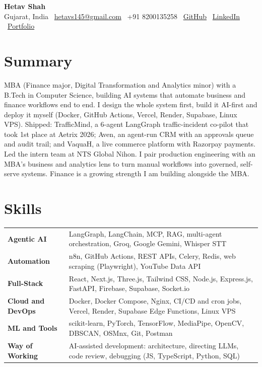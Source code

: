 \documentclass[a4paper,9pt]{extarticle}
\begin{document}
\begin{center}
  {\LARGE\bfseries Hetav Shah}\\[3pt]
  {\small
    Gujarat, India \textperiodcentered\
    \href{mailto:hetavs145@gmail.com}{hetavs145@gmail.com} \textperiodcentered\
    +91 8200135258 \textperiodcentered\
    \href{https://github.com/Hetavs145/}{GitHub} \textperiodcentered\
    \href{https://www.linkedin.com/in/hetav-shah-26601722b}{LinkedIn} \textperiodcentered\
    \href{https://portfolio.vaquah.in}{Portfolio}
  }
\end{center}
\vspace{2pt}

\section{Summary}
MBA (Finance major, Digital Transformation and Analytics minor) with a B.Tech in Computer Science, building AI systems that automate business and finance workflows end to end. I design the whole system first, build it AI-first and deploy it myself (Docker, GitHub Actions, Vercel, Render, Supabase, Linux VPS). Shipped: TrafficMind, a 6-agent LangGraph traffic-incident co-pilot that took 1st place at Aetrix 2026; Aven, an agent-run CRM with an approvals queue and audit trail; and VaquaH, a live commerce platform with Razorpay payments. Led the intern team at NTS Global Nihon. I pair production engineering with an MBA's business and analytics lens to turn manual workflows into governed, self-serve systems. Finance is a growing strength I am building alongside the MBA.

\section{Skills}
\begin{tabular}{@{}p{}p{}@{}}
\textbf{Agentic AI} & LangGraph, LangChain, MCP, RAG, multi-agent orchestration, Groq, Google Gemini, Whisper STT \\[1.5pt]
\textbf{Automation} & n8n, GitHub Actions, REST APIs, Celery, Redis, web scraping (Playwright), YouTube Data API \\[1.5pt]
\textbf{Full-Stack} & React, Next.js, Three.js, Tailwind CSS, Node.js, Express.js, FastAPI, Firebase, Supabase, Socket.io \\[1.5pt]
\textbf{Cloud and DevOps} & Docker, Docker Compose, Nginx, CI/CD and cron jobs, Vercel, Render, Supabase Edge Functions, Linux VPS \\[1.5pt]
\textbf{ML and Tools} & scikit-learn, PyTorch, TensorFlow, MediaPipe, OpenCV, DBSCAN, OSMnx, Git, Postman \\[1.5pt]
\textbf{Way of Working} & AI-assisted development: architecture, directing LLMs, code review, debugging (JS, TypeScript, Python, SQL) \\
\end{tabular}
\end{document}
